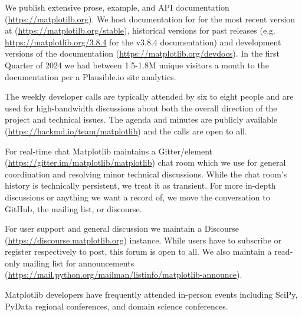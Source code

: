 \documentclass[12pt]{article}
\numberwithin{page}{section}
\begin{document}
We publish extensive prose, example, and API documentation
(\url{https://matplotilb.org}).  We host documentation for for the most recent
version at (\url{https://matplotilb.org/stable}), historical versions for past
releases (e.g. \url{https://matplotlib.org/3.8.4} for the v3.8.4 documentation)
and development versions of the documentation
(\url{https://matplotlib.org/devdocs}).  In the first Quarter of 2024 we had
between 1.5-1.8M unique visitors a month to the documentation per a
Plausible.io site analytics.

The weekly developer calls are typically attended by six to eight people and
are used for high-bandwidth discussions about both the overall direction of the
project and technical issues.  The agenda and minutes are publicly available
(\url{https://hackmd.io/team/matplotlib}) and the calls are open to all.

For real-time chat Matplotlib maintains a Gitter/element
(\url{https://gitter.im/matplotlib/matplotlib}) chat room which we use for
general coordination and resolving minor technical discussions.  While the chat
room's history is technically persistent, we treat it as transient.  For more
in-depth discussions or anything we want a record of, we move the conversation
to GitHub, the mailing list, or discourse.

For user support and general discussion we maintain a Discourse
(\url{https://discourse.matplotlib.org}) instance.  While users have to
subscribe or register respectively to post, this forum is open to all.  We also
maintain a read-only mailing list for announcements
(\url{https://mail.python.org/mailman/listinfo/matplotlib-announce}).

Matplotlib developers have frequently attended in-person events including
SciPy, PyData regional conferences, and domain science conferences.

\newpage

\def\ref@jnl#1{{\rm#1}}
\end{document}
